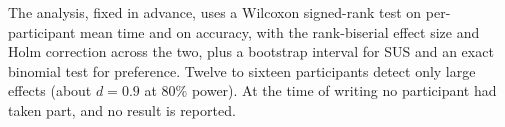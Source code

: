 The analysis, fixed in advance, uses a Wilcoxon signed-rank test on per-participant mean time and on accuracy, with the rank-biserial effect size and Holm correction across the two, plus a bootstrap interval for SUS and an exact binomial test for preference. Twelve to sixteen participants detect only large effects (about $d{=}0.9$ at 80\% power). At the time of writing no participant had taken part, and no result is reported.
